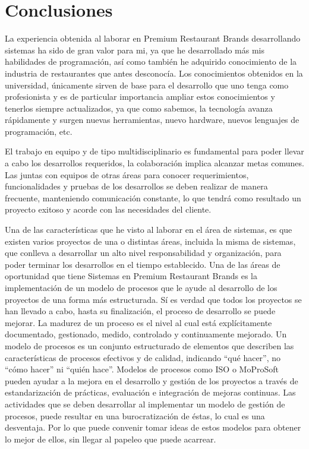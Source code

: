 
\chapter{Conclusiones}
\label{chap:conclusiones}

La experiencia obtenida al laborar en Premium Restaurant Brands desarrollando sistemas ha sido de gran valor para mi, ya que he desarrollado más mis habilidades de programación, así como también he adquirido conocimiento de la industria de restaurantes que antes desconocía. Los conocimientos obtenidos en la universidad, únicamente sirven de base para el desarrollo que uno tenga como profesionista y es de particular importancia ampliar estos conocimientos y tenerlos siempre actualizados, ya que como sabemos, la tecnología avanza rápidamente y surgen nuevas herramientas, nuevo hardware, nuevos lenguajes de programación, etc.

El trabajo en equipo y de tipo multidisciplinario es fundamental para poder llevar a cabo los desarrollos requeridos, la colaboración implica alcanzar metas comunes. Las juntas con equipos de otras áreas para conocer requerimientos, funcionalidades y pruebas de los desarrollos se deben realizar de manera frecuente, manteniendo comunicación constante, lo que tendrá como resultado un proyecto exitoso y acorde con las necesidades del cliente.

Una de las características que he visto al laborar en el área de sistemas, es que existen varios proyectos de una o distintas áreas, incluida la misma de sistemas, que conlleva a desarrollar un alto nivel responsabilidad y organización, para poder terminar los desarrollos en el tiempo establecido. Una de las áreas de oportunidad que tiene Sistemas en Premium Restaurant Brands es la implementación de un modelo de procesos que le ayude al desarrollo de los proyectos de una forma más estructurada. Sí es verdad que todos los proyectos se han llevado a cabo, hasta su finalización, el proceso de desarrollo se puede mejorar. La madurez de un proceso es el nivel al cual está explícitamente documentado, gestionado, medido, controlado y continuamente mejorado. Un modelo de procesos es un conjunto estructurado de elementos que describen las características de procesos efectivos y de calidad, indicando ``qué hacer'', no ``cómo hacer'' ni ``quién hace''. Modelos de procesos como ISO o MoProSoft pueden ayudar a la mejora en el desarrollo y gestión de los proyectos a través de estandarización de prácticas, evaluación e integración de mejoras continuas. Las actividades que se deben desarrollar al implementar un modelo de gestión de procesos, puede resultar en una  burocratización de éstas, lo cual es una desventaja. Por lo que puede convenir tomar ideas de estos modelos para obtener lo mejor de ellos, sin llegar al papeleo que puede acarrear.



